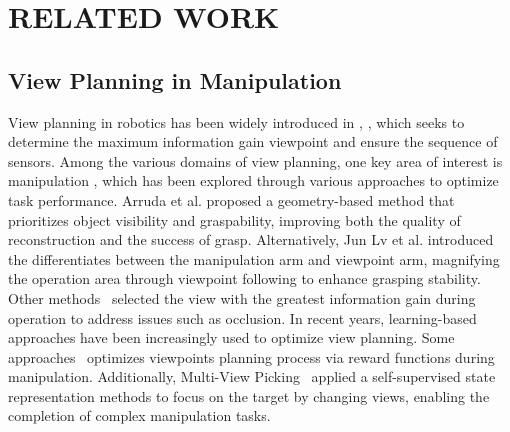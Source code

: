 \section{RELATED WORK}
\subsection{View Planning in Manipulation}

View planning in robotics has been widely introduced in \cite{DBLP:journals/cvm/ZengWZL20}, \cite{chen2011active}, which seeks to determine the maximum information gain viewpoint and ensure the sequence of sensors. Among the various domains of view planning, one key area of interest is manipulation , which has been explored through various approaches to optimize task performance.
Arruda et al. \cite{ArrudaDexterous2016} proposed a geometry-based method that prioritizes object visibility and graspability, improving both the quality of reconstruction and the success of grasp. Alternatively, Jun Lv et al. \cite{lv2023samrlsensingawaremodelbasedreinforcement} introduced the differentiates between the manipulation arm and viewpoint arm, magnifying the operation area through viewpoint following to enhance grasping stability. 
Other methods~\cite{DBLP:journals/corr/abs-2409-17435,BreyerNBV2022,WangOTA2024} selected the view with the greatest information gain during operation to address issues such as occlusion.
In recent years, learning-based approaches have been increasingly used to optimize view planning. Some approaches~\cite{cheng2018reinforcement, ShangR2023, chen2020transferable} optimizes viewpoints planning process via reward functions during manipulation.
Additionally, Multi-View Picking~\cite{zaky2020active} applied a self-supervised state representation methods to focus on the target by changing views, enabling the completion of complex manipulation tasks.


